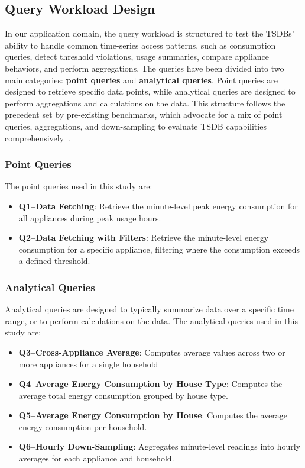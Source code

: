 \documentclass[conference]{IEEEtran}
\begin{document}
\subsection{Query Workload Design}
In our application domain, the query workload is structured to test the TSDBs' ability to handle common time-series access patterns, such as consumption queries, detect threshold violations, usage summaries, compare appliance behaviors, and perform aggregations.
The queries have been divided into two main categories: \textbf{point queries} and \textbf{analytical queries}. Point queries are designed to retrieve specific data points, while analytical queries are designed to perform aggregations and calculations on the data. This structure follows the precedent set by pre-existing benchmarks, which advocate for a mix of point queries, aggregations, and down-sampling to evaluate TSDB capabilities comprehensively~\cite{3_tsbs,11_iotdbencoding2022}.
\subsubsection{Point Queries}
The point queries used in this study are:
\begin{itemize}
    \item \textbf{Q1--Data Fetching}: Retrieve the minute-level peak energy consumption for all appliances during peak usage hours.
    \item \textbf{Q2--Data Fetching with Filters}: Retrieve the minute-level energy consumption for a specific appliance, filtering where the consumption exceeds a defined threshold.
\end{itemize}
\subsubsection{Analytical Queries}
Analytical queries are designed to typically summarize data over a specific time range, or to perform calculations on the data. The analytical queries used in this study are:
\begin{itemize}
  \item \textbf{Q3--Cross-Appliance Average}: Computes average values across two or more appliances for a single household 
  \item \textbf{Q4--Average Energy Consumption by House Type}: Computes the average total energy consumption grouped by house type.   
  \item \textbf{Q5--Average Energy Consumption by House}: Computes the average energy consumption per household.      
  \item \textbf{Q6--Hourly Down-Sampling}: Aggregates minute-level readings into hourly averages for each appliance and household.     
\end{itemize}
\end{document}
